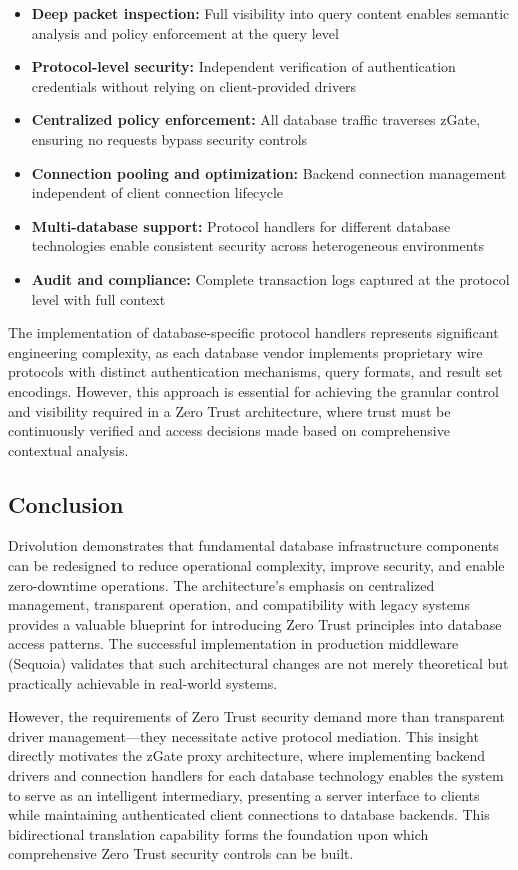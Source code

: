 \begin{itemize}
    \item \textbf{Deep packet inspection:} Full visibility into query content enables semantic analysis and policy enforcement at the query level
    \item \textbf{Protocol-level security:} Independent verification of authentication credentials without relying on client-provided drivers
    \item \textbf{Centralized policy enforcement:} All database traffic traverses zGate, ensuring no requests bypass security controls
    \item \textbf{Connection pooling and optimization:} Backend connection management independent of client connection lifecycle
    \item \textbf{Multi-database support:} Protocol handlers for different database technologies enable consistent security across heterogeneous environments
    \item \textbf{Audit and compliance:} Complete transaction logs captured at the protocol level with full context
\end{itemize}

The implementation of database-specific protocol handlers represents significant engineering complexity, as each database vendor implements proprietary wire protocols with distinct authentication mechanisms, query formats, and result set encodings. However, this approach is essential for achieving the granular control and visibility required in a Zero Trust architecture, where trust must be continuously verified and access decisions made based on comprehensive contextual analysis.

\subsection{Conclusion}

Drivolution demonstrates that fundamental database infrastructure components can be redesigned to reduce operational complexity, improve security, and enable zero-downtime operations. The architecture's emphasis on centralized management, transparent operation, and compatibility with legacy systems provides a valuable blueprint for introducing Zero Trust principles into database access patterns. The successful implementation in production middleware (Sequoia) validates that such architectural changes are not merely theoretical but practically achievable in real-world systems.

However, the requirements of Zero Trust security demand more than transparent driver management—they necessitate active protocol mediation. This insight directly motivates the zGate proxy architecture, where implementing backend drivers and connection handlers for each database technology enables the system to serve as an intelligent intermediary, presenting a server interface to clients while maintaining authenticated client connections to database backends. This bidirectional translation capability forms the foundation upon which comprehensive Zero Trust security controls can be built.

